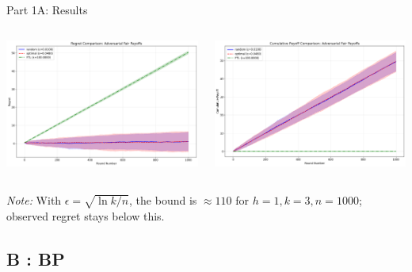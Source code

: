\documentclass{beamer}
\begin{document}
\begin{frame}{Part 1A: Results}
\begin{columns}[T,onlytextwidth]
  \centering
  \includegraphics[width=\linewidth]{../figures/adversarial_regret_comparison.png}

  \centering
  \includegraphics[width=\linewidth]{figures/AFR_payoff.png}
\end{columns}
\vspace{0.3em}
\small \textit{Note:} With $\epsilon=\sqrt{\ln k/n}$, the bound is $\approx 110$ for $h=1,k=3,n=1000$; observed regret stays below this.
\end{frame}

\subsection{B : BP}
\end{document}
